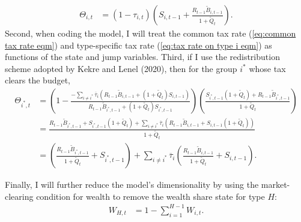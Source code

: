 \documentclass[12 pt, oneside]{article}
\theoremstyle{definition}
\theoremstyle{definition}
\theoremstyle{definition}
\begin{document}
\begin{align*}
  \Theta_{i, t} & = (1 - \tau_{i, t})\left(S_{i, t - 1} + \frac{R_{t - 1}\tilde{B}_{i, t - 1}}{1 + \tilde{Q}_t}\right).
\end{align*}
Second, when coding the model, I will treat the common tax rate (\ref{eq:common tax rate eqm}) and type-specific tax rate (\ref{eq:tax rate on type i eqm}) as functions of the state and jump variables. Third, if I use the redistribution scheme adopted by Kekre and Lenel (2020), then
for the group $i^*$ whose tax clears the budget,
\begin{align*}
  \Theta_{i^*, t} & = \left(1 - \frac{-\sum_{i \neq i^*} \overline{\tau}_i (R_{t - 1}\tilde{B}_{i, t - 1} + (1 + \tilde{Q}_t) S_{i, t - 1})}{R_{t - 1}\tilde{B}_{i^*, t - 1} + (1 + \tilde{Q}_t)S_{i^*, t - 1}}\right)\left(\frac{S_{i^*, t - 1}(1 + \tilde{Q}_t) + R_{t - 1}\tilde{B}_{i^*, t - 1}}{1 + \tilde{Q}_t}\right)\\
                  & = \frac{R_{t - 1}\tilde{B}_{i^*, t - 1} + S_{i^*, t - 1}(1 + \tilde{Q}_t) + \sum_{i\neq i^*}\overline{\tau}_i(R_{t - 1}\tilde{B}_{i, t - 1} + S_{i, t - 1}(1 + \tilde{Q}_t))}{1 + \tilde{Q}_t}\\
                  & = \left(\frac{R_{t - 1}\tilde{B}_{i^*, t - 1}}{1 + \tilde{Q}_t} + S_{i^*, t - 1}\right) + \sum_{i\neq i^*}\overline{\tau}_i\left(\frac{R_{t - 1}\tilde{B}_{i, t - 1}}{1 + \tilde{Q}_t} + S_{i, t - 1}\right).
\end{align*}

Finally, I will further reduce the model's dimensionality by using the market-clearing condition for wealth to remove the wealth share state for type $H$:
\begin{align}
  W_{H, t} & = 1 - \sum_{i = 1}^{H - 1} W_{i, t}.
\end{align}
\end{document}
